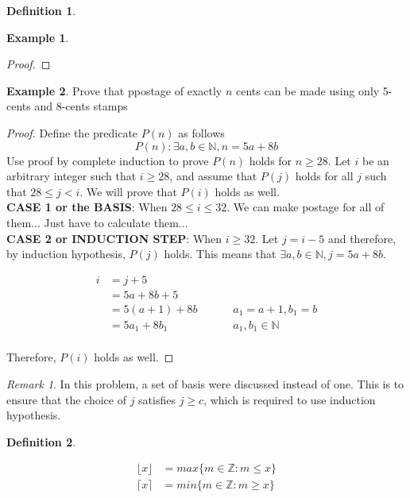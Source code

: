 \documentclass[11pt]{article}
\theoremstyle{plain}%
\theoremstyle{definition}
\newtheorem{defn}{Definition}
\newtheorem{exmp}{Example}[defn]
\theoremstyle{remark}
\newtheorem*{rem}{Remark}
\begin{document}
\begin{defn}
\begin{exmp}
\begin{proof}
    \end{proof}
  \end{exmp}

  \begin{exmp}
    Prove that ppostage of exactly $n$ cents can be made using only 5-cents and 8-cents stamps
    \begin{proof}
      Define the predicate $P(n)$ as follows
      \[
        P(n): \exists a,b\in\mathbb{N}, n = 5a + 8b
      \]
      Use proof by complete induction to prove $P(n)$ holds for $n \geq 28$. Let $i$ be an arbitrary integer such that $i\geq 28$, and assume that $P(j)$ holds for all $j$ such that $28 \leq j < i$. We will prove that $P(i)$ holds as well. \\
      \textbf{CASE 1 or the BASIS}: When $28 \leq i \leq 32$. We can make postage for all of them... Just have to calculate them... \\
      \textbf{CASE 2 or INDUCTION STEP}: When $i\geq 32$. Let $j = i-5$ and therefore, by induction hypothesis, $P(j)$ holds. This means that $\exists a,b \in\mathbb{N}, j=5a + 8b$.

      \begin{align*}
        i &= j + 5 \\
        &= 5a + 8b + 5\\
        &= 5(a+1) + 8b && &&\text{$a_1 = a + 1, b_1 = b$}\\
        &= 5a_1 + 8b_1 && &&\text{$a_1, b_1 \in\mathbb{N}$}\\
      \end{align*}

      Therefore, $P(i)$ holds as well.
    \end{proof}
    \begin{rem}
      In this problem, a set of basis were discussed instead of one. This is to ensure that the choice of $j$ satisfies $j \geq c$, which is required to use induction hypothesis.
    \end{rem}
  \end{exmp}

\end{defn}

\begin{defn}
  \label{floor and ceiling}

  \begin{align*}
    \lfloor x \rfloor &= max\{ m\in \mathbb{Z}: m \leq x\} \\
    \lceil x \rceil &= min\{ m\in \mathbb{Z}: m \geq x\}
  \end{align*}



\end{defn}
\end{document}
